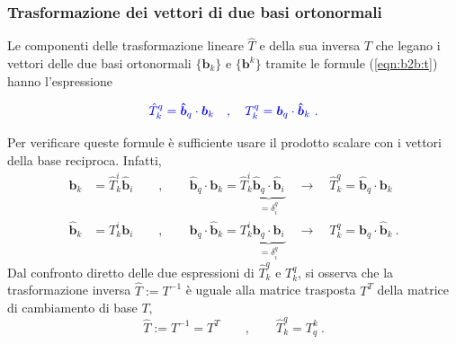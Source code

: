 \subsubsection{Trasformazione dei vettori di due basi ortonormali}
Le componenti delle trasformazione lineare $\hat{T}$ e della sua inversa $T$ che legano i vettori delle due basi ortonormali $\{\bm{b}_k\}$ e $\{\bm{b}^k\}$ tramite le formule (\ref{eqn:b2b:t}) hanno l'espressione
\begin{fBox}
\begin{equation}
{\color{blue}
  \hat{T}^q_k = \bm{\hat{b}}_q \cdot \bm{b}_k \quad , \quad T^q_k = \bm{b}_q \cdot \bm{\hat{b}}_k \ .
}
\end{equation}
\end{fBox}
Per verificare queste formule è sufficiente usare il prodotto scalare con i vettori della base reciproca. Infatti,
{\color{blue}
\begin{equation}
\begin{aligned}
 \bm{b}_k & = \hat{T}^i_k \bm{\hat{b}}_i \qquad , \qquad 
 \bm{\hat{b}}_q \cdot \bm{b}_k = \hat{T}^i_k \underbrace{\bm{\hat{b}}_q \cdot \bm{\hat{b}}_i}_{=\delta^q_i} \quad \rightarrow  \quad \hat{T}^q_k = \bm{\hat{b}}_q \cdot \bm{b}_k \\
 \bm{\hat{b}}_k & = {T}^i_k \bm{b}_i \qquad , \qquad 
 \bm{b}_q \cdot \bm{\hat{b}}_k = T^i_k \underbrace{\bm{b}_q \cdot \bm{b}_i}_{=\delta^q_i} \quad \rightarrow  \quad T^q_k = \bm{b}_q \cdot \bm{\hat{b}}_k \ .
\end{aligned} 
\end{equation}
}
Dal confronto diretto delle due espressioni di $\hat{T}^q_k$ e $T^q_k$, si osserva che la trasformazione inversa $\hat{T}:=T^{-1}$ è uguale alla matrice trasposta $T^T$ della matrice di cambiamento di base $T$,
{\color{blue}
\begin{equation}
 \hat{T} := T^{-1} = T^T \qquad , \qquad \hat{T}^q_k = T^k_q \ .
\end{equation}
}

